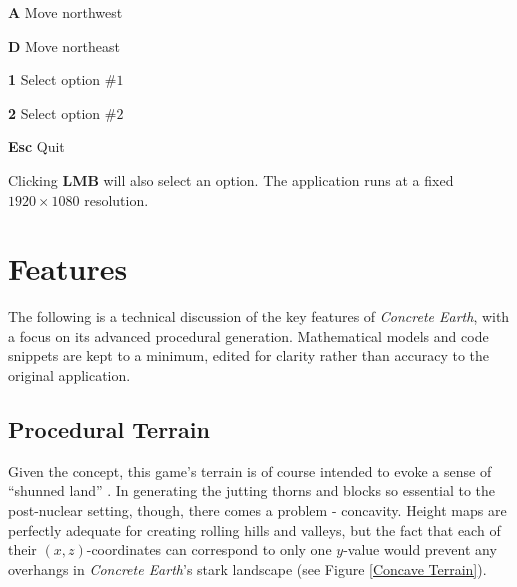 \documentclass[a4paper, 11pt]{article}
\begin{document}
\begin{flushleft}
\begin{center}
{\vspace{2.5pt}\noindent 
\textbf{A} \dotfill{} Move northwest

\vspace{2.5pt}\noindent 
\textbf{D} \dotfill{} Move northeast

\vspace{2.5pt}\noindent 
\textbf{1} \dotfill{} Select option \#$1$

\vspace{2.5pt}\noindent 
\textbf{2} \dotfill{} Select option \#$2$


\vspace{2.5pt}\noindent 
\textbf{Esc} \dotfill{} Quit
}\linebreak
\end{center}

Clicking \textbf{LMB} will also select an option. The application runs at a fixed $1920 \times 1080$ resolution.

\section{Features}\label{Features}

The following is a technical discussion of the key features of \textit{Concrete Earth}, with a focus on its advanced procedural generation. Mathematical models and code snippets are kept to a minimum, edited for clarity rather than accuracy to the original application.


\subsection{Procedural Terrain}\label{Procedural Terrain} %

Given the concept, this game's terrain is of course intended to evoke a sense of ``shunned land'' \citep{trth93}. In generating the jutting thorns and blocks so essential to the post-nuclear setting, though, there comes a problem - concavity. Height maps are perfectly adequate for creating rolling hills and valleys, but the fact that each of their $(x,z)$-coordinates can correspond to only one $y$-value would prevent any overhangs in \textit{Concrete Earth}'s stark landscape (see Figure \ref{Concave Terrain}).


\end{flushleft}
\end{document}
